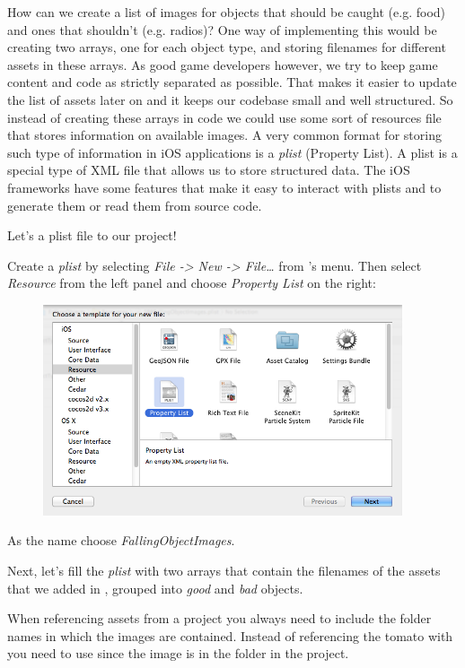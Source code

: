 How can we create a list of images for objects that should be caught (e.g.
food) and ones that shouldn't (e.g. radios)? One way of implementing this would
be creating two arrays, one for each object type, and storing filenames for 
different assets in these arrays. As good game developers however, we try to
keep game content and code as strictly separated as possible. That makes it
easier to update the list of assets later on and it keeps our codebase small and well
structured. So instead of creating these arrays in code we could use some sort
of resources file that stores information on available images. A very common 
format for storing such type of information in iOS applications is a
\textit{plist} (Property List). A plist is a special type of XML file that allows us to
store structured data. The iOS frameworks have some
features that make it easy to interact with plists and to generate them or read
them from source code.

Let's a plist file to our project!

\begin{leftbar}
Create a \textit{plist} by selecting \textit{File ->
New -> File\ldots} from \xcode{}'s menu. 
Then select \textit{Resource} from the left panel and choose
\textit{Property List} on the right:

\begin{figure}[H]
    \centering
    \includegraphics[width=300pt]{images/Chapter2/create_plist.png}
\end{figure}

As the name choose \textit{FallingObjectImages}.
\end{leftbar} 

Next, let's fill the \textit{plist} with two arrays that contain the filenames
of the assets that we added in \SB{}, grouped into \textit{good} and
\textit{bad} objects. 

When referencing assets from a \SB{} project you always
need to include the folder names in which the images are contained. Instead of
referencing the tomato with  you need to use
 since the image is in the 
folder in the \SB{} project.

